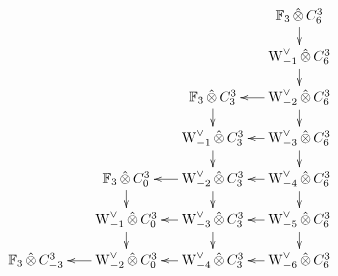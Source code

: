 
\[
	\xymatrix@R=.4cm@C=.4cm{
		\phantom{W_4 \hotimes C^{3}_{-3}} &
		\phantom{W_4 \hotimes C^{3}_{-3}} &
		\phantom{W_4 \hotimes C^{3}_{0}} &
		\phantom{W_4 \hotimes C^{3}_{3}} &
		\bF_3 \hotimes C^{3}_{6}\ar[d]
		\\
		\phantom{W_3 \hotimes C^{3}_{-3}} &
		\phantom{W_3 \hotimes C^{3}_{-3}} &
		\phantom{W_3 \hotimes C^{3}_{0}} &
		\phantom{W_3 \hotimes C^{3}_{3}} &
		\rWd[-1] \hotimes C^{3}_{6}\ar[d]
		\\
		\phantom{W_2 \hotimes C^{3}_{-3}} &
		\phantom{W_2 \hotimes C^{3}_{-3}} &
		\phantom{W_2 \hotimes C^{3}_{0}} &
		\bF_3 \hotimes C^{3}_{3}\ar[d] &
		\rWd[-2] \hotimes C^{3}_{6}\ar[d]\ar[l]
		\\
		\phantom{W_1 \hotimes C^{3}_{-3}} &
		\phantom{W_1 \hotimes C^{3}_{-3}}&
		\phantom{W_1 \hotimes C^{3}_{0}} &
		\rWd[-1] \hotimes C^{3}_{3}\ar[d] &
		\rWd[-3] \hotimes C^{3}_{6}\ar[d]\ar[l]
		\\
		\phantom{W_0 \hotimes C^{3}_{-3}} &
		\phantom{W_0 \hotimes C^{3}_{-3}}&
		\bF_3 \hotimes C^{3}_{0}\ar[d] &
		\rWd[-2] \hotimes C^{3}_{3}\ar[d]\ar[l] &
		\rWd[-4] \hotimes C^{3}_{6}\ar[d]\ar[l]
		\\
		\phantom{\rWd[-1] \hotimes C^{3}_{-3}} &
		\phantom{\rWd[-1] \hotimes C^{3}_{-3}} &
		\rWd[-1] \hotimes C^{3}_{0}\ar[d] &
		\rWd[-3] \hotimes C^{3}_{3}\ar[d]\ar[l] &
		\rWd[-5] \hotimes C^{3}_{6}\ar[d]\ar[l]
		\\
		\phantom{\rWd[-2] \hotimes C^{3}_{-3}} &
		\bF_3 \hotimes C^{3}_{-3} &
		\rWd[-2] \hotimes C^{3}_{0}\ar[l] &
		\rWd[-4] \hotimes C^{3}_{3}\ar[l] &
		\rWd[-6] \hotimes C^{3}_{6}\ar[l]
}
\]
